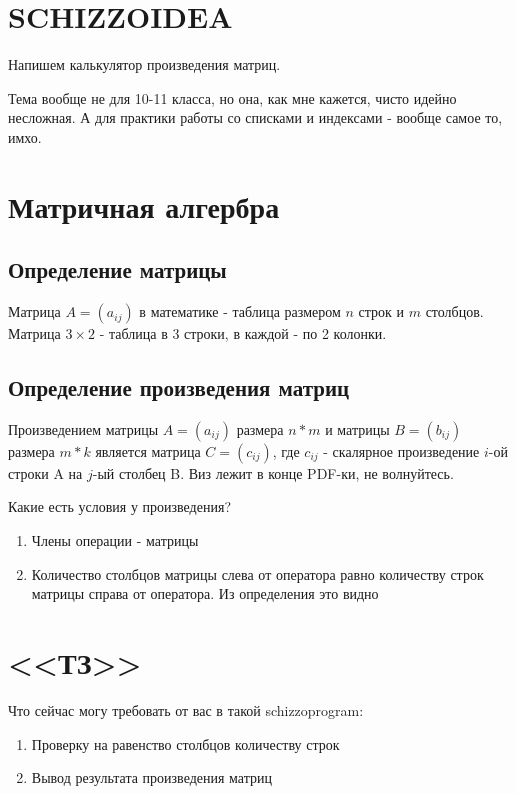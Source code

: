 


	
	\tableofcontents
	
	\section{SCHIZZOIDEA}
		Напишем калькулятор произведения матриц.
		
		Тема вообще не для 10-11 класса, но она, как мне кажется, чисто идейно несложная.
		А для практики работы со списками и индексами - вообще самое то, имхо.
	
	\section{Матричная алгербра}
	\subsection{Определение матрицы}
		Матрица $A = (a_{ij})$ в математике - таблица размером $n$ строк и $m$ столбцов.
		Матрица $3\times2$ - таблица в 3 строки, в каждой - по 2 колонки.
		
	\subsection{Определение произведения матриц}
		Произведением матрицы $A=(a_{ij})$ размера $n*m$ и матрицы $B=(b_{ij})$ размера $m*k$ является матрица $C=(c_{ij})$, где $c_{ij}$ - скалярное произведение $i$-ой строки A на $j$-ый столбец B. Виз лежит в конце PDF-ки, не волнуйтесь.
	
		Какие есть условия у произведения?
		\begin{enumerate}
			\item Члены операции - матрицы
			\item Количество столбцов матрицы слева от оператора равно количеству строк матрицы справа от оператора. Из определения это видно
		\end{enumerate}

	\section{<<ТЗ>>}
		Что сейчас могу требовать от вас в такой schizzoprogram:
		\begin{enumerate}
			\item Проверку на равенство столбцов количеству строк
			\item Вывод результата произведения матриц
		\end{enumerate}
	
